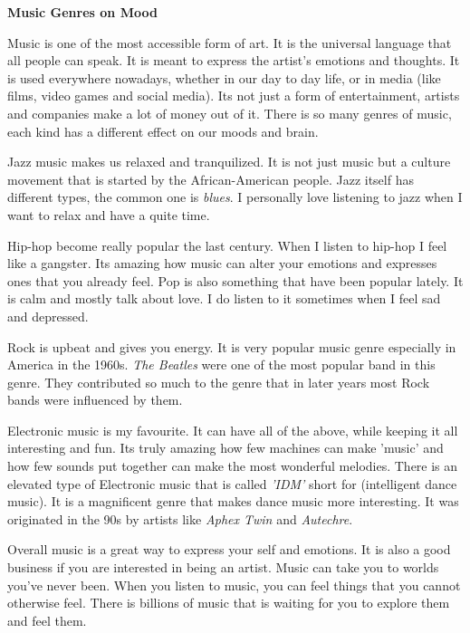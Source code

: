 \documentclass[12pt, a4paper]{article}
\begin{document}
\begin{center}
\huge{\textbf{Music Genres on Mood}}\\[1.2cm]
\end{center}

 Music is one of the most accessible form of art. It is the universal
language that all people can speak. It is meant to express the artist's
emotions and thoughts. It is used everywhere nowadays, whether in our day to day
life, or in media (like films, video games and social media). Its not just a form 
of entertainment, artists and companies make a lot of money out of it. There is 
so many genres of music, each kind has a different effect on our moods and brain.\bigbreak

Jazz music makes us relaxed and tranquilized. It is not just music 
but a culture movement that is started by the African-American people. Jazz itself
has different types, the common one is \textit{blues}. I personally love listening
to jazz when I want to relax and have a quite time.\bigbreak

Hip-hop become really popular the last century. When I listen to hip-hop I feel
like a gangster. Its amazing how music can alter your emotions and expresses
ones that you already feel. Pop is also something that have been popular lately. It is
calm and mostly talk about love. I do listen to it sometimes when I feel sad 
and depressed.\bigbreak

Rock is upbeat and gives you energy. It is very popular music genre especially 
in America in the 1960s. \textit{The Beatles} were one of the most popular band in this
genre. They contributed so much to the genre that in later years most Rock
bands were influenced by them.\bigbreak

Electronic music is my favourite. It can have all of the above, while keeping 
it all interesting and fun. Its truly amazing how few machines can make 'music' and
how few sounds put together can make the most wonderful melodies. There is an elevated
type of Electronic music that is called \textit{'IDM'} short for (intelligent dance music).
It is a magnificent genre that makes dance music more interesting. It was originated 
in the 90s by artists like \textit{Aphex Twin} and \textit{Autechre}.\bigbreak

Overall music is a great way to express your self and emotions. It is also a good
business if you are interested in being an artist. Music can take you to worlds 
you've never been. When you listen to music, you can feel things that you cannot otherwise 
feel. There is billions of music that is waiting for you to explore them and feel them.
\end{document}

